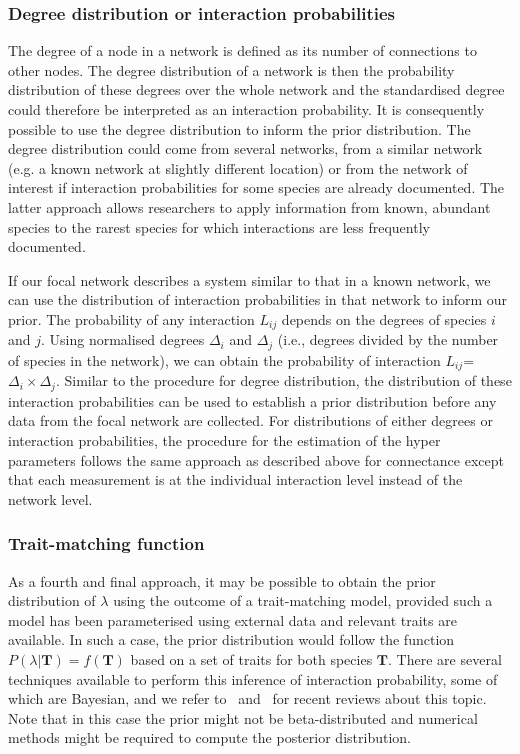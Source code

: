 \documentclass[12pt]{article}
\begin{document}
\begin{spacing}{2.0}
      \subsubsection*{Degree distribution or interaction probabilities}

          The degree of a node in a network is defined as its number of connections to other nodes. The degree distribution of a network is then the probability distribution of these degrees over the whole network and the standardised degree could therefore be interpreted as an interaction probability. It is consequently possible to use the degree distribution to inform the prior distribution. The degree distribution could come from several networks, from a similar network (e.g. a known network at slightly different location) or from the network of interest if interaction probabilities for some species are already documented. The latter approach allows researchers to apply information from known, abundant species to the rarest species for which interactions are less frequently documented. 


          If our focal network describes a system similar to that in a known network, we can use the distribution of interaction probabilities in that network to inform our prior. The probability of any interaction $L_{ij}$ depends on the degrees of species $i$ and $j$. Using normalised degrees $\Delta_i$ and $\Delta_j$ (i.e., degrees divided by the number of species in the network), we can obtain the probability of interaction $L_{ij}$=$\Delta_i\times\Delta_j$. Similar to the procedure for degree distribution, the distribution of these interaction probabilities can be used to establish a prior distribution before any data from the focal network are collected. For distributions of either degrees or interaction probabilities, the procedure for the estimation of the hyper parameters follows the same approach as described above for connectance except that each measurement is at the individual interaction level instead of the network level.


      \subsubsection*{Trait-matching function} 

          As a fourth and final approach, it may be possible to obtain the prior distribution of $\lambda$ using the outcome of a trait-matching model, provided such a model has been parameterised using external data and relevant traits are available. In such a case, the prior distribution would follow the function $P(\lambda|\mathbf{T})=f(\mathbf{T})$ based on a set of traits for both species $\mathbf{T}$. There are several techniques available to perform this inference of interaction probability, some of which are Bayesian, and we refer to~\citet{Bartomeus2016} and~\citet{Weinstein2017} for recent reviews about this topic. Note that in this case the prior might not be beta-distributed and numerical methods might be required to compute the posterior distribution.  



\end{spacing}
\end{document}
